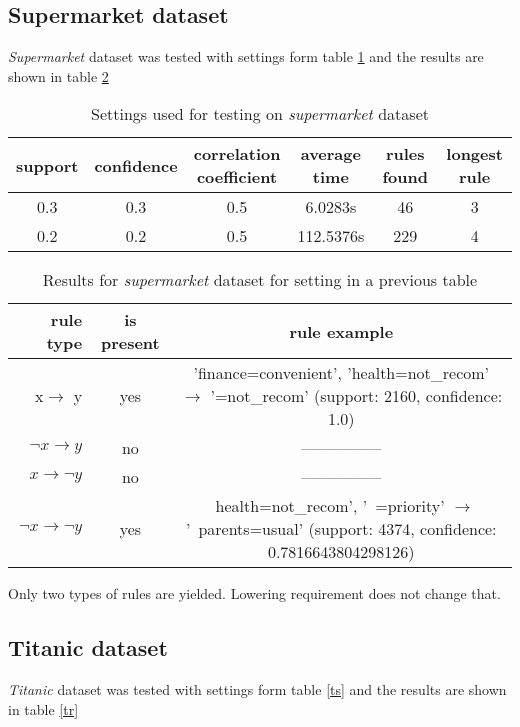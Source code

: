 \documentclass{article}
\begin{document}
	\subsection{Supermarket dataset}
	\textit{Supermarket} dataset was tested with settings form table \ref{ss} and the results are shown in table \ref{sr}
	
	\begin{table}[H]
		\centering
		\caption{Settings used for testing on \textit{supermarket} dataset}
		\label{ss}
		\begin{tabular}{c |c |c|c|c|c}
			support&confidence&\makecell{correlation\\coefficient}&average time&rules found&longest rule\\
			\hline
			\hline
			0.3&0.3&0.5&6.0283s&46&3\\
			\hline
			0.2&0.2&0.5&112.5376s&229&4\\
		\end{tabular}
	\end{table}
	\begin{table}[H]
		\centering
		\caption{Results for \textit{supermarket} dataset for setting in a previous table}
		\label{sr}
		\begin{tabular}{r|c |c}
			rule type& is present & rule example\\
			\hline
			\hline
			x$\rightarrow$ y & yes &\makecell{'finance=convenient', 'health=not\_recom' $\rightarrow$\\ '=not\_recom'\\ (support: 2160, confidence: 1.0)} \\
			\hline
			$\neg x\rightarrow y$ & no &---------------\\
			\hline
			$x\rightarrow \neg y $& no &---------------\\
			\hline
			$\neg x\rightarrow \neg y $& yes &\makecell{~health=not\_recom', '~=priority' $\rightarrow$\\ '~parents=usual'\\ (support: 4374, confidence: 0.7816643804298126)} \\ 
		\end{tabular}
	\end{table}
	Only two types of rules are yielded. Lowering requirement does not change that.
	
	\subsection{Titanic dataset}
	\textit{Titanic} dataset was tested with settings form table \ref{ts} and the results are shown in table \ref{tr}
	
\end{document}
